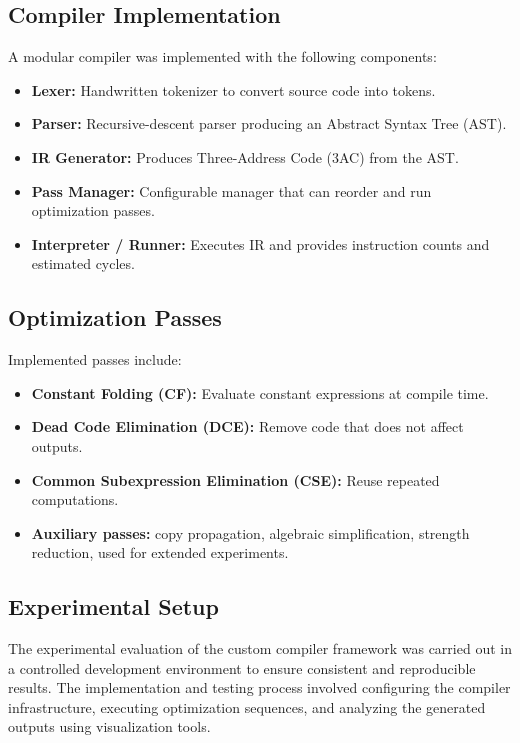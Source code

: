 \documentclass[conference]{IEEEtran}
\begin{document}
\subsection{Compiler Implementation}
A modular compiler was implemented with the following components:
\begin{itemize}
    \item \textbf{Lexer:} Handwritten tokenizer to convert source code into tokens.
    \item \textbf{Parser:} Recursive-descent parser producing an Abstract Syntax Tree (AST).
    \item \textbf{IR Generator:} Produces Three-Address Code (3AC) from the AST.
    \item \textbf{Pass Manager:} Configurable manager that can reorder and run optimization passes.
    \item \textbf{Interpreter / Runner:} Executes IR and provides instruction counts and estimated cycles.
\end{itemize}

\subsection{Optimization Passes}
Implemented passes include:
\begin{itemize}
    \item \textbf{Constant Folding (CF):} Evaluate constant expressions at compile time.
    \item \textbf{Dead Code Elimination (DCE):} Remove code that does not affect outputs.
    \item \textbf{Common Subexpression Elimination (CSE):} Reuse repeated computations.
    \item \textbf{Auxiliary passes:} copy propagation, algebraic simplification, strength reduction, used for extended experiments.
\end{itemize}

\subsection{Experimental Setup}

The experimental evaluation of the custom compiler framework was carried out in a controlled development environment to ensure consistent and reproducible results. The implementation and testing process involved configuring the compiler infrastructure, executing optimization sequences, and analyzing the generated outputs using visualization tools.
\end{document}
